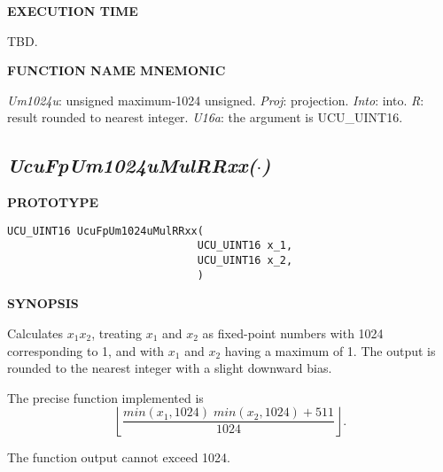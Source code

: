 \noindent\textbf{EXECUTION TIME}
\begin{list}{}{\setlength{\leftmargin}{0.25in}\setlength{\topsep}{0.0in}}
\item TBD.
\end{list}
\vspace{2.8ex}

\noindent\textbf{FUNCTION NAME MNEMONIC}
\begin{list}{}{\setlength{\leftmargin}{0.25in}\setlength{\topsep}{0.0in}}
\item \emph{Um1024u}: unsigned maximum-1024 unsigned.
      \emph{Proj}:    projection.
      \emph{Into}:    into.
      \emph{R}:       result rounded to nearest integer.
      \emph{U16a}:    the argument is UCU\_UINT16.
\end{list}


\subsection[\emph{UcuFpUm1024uMulRRxx(\protect\mbox{\protect$\cdot$})}]
           {\emph{UcuFpUm1024uMulRRxx(\protect\mbox{\protect\boldmath $\cdot$})}}
\label{cfpa0:subf0:sfaa1}

%

\noindent\textbf{PROTOTYPE}
\begin {list}{}{\setlength{\leftmargin}{0.25in}\setlength{\topsep}{0.0in}}
\item
\begin{verbatim}
UCU_UINT16 UcuFpUm1024uMulRRxx(
                              UCU_UINT16 x_1, 
                              UCU_UINT16 x_2, 
                              )
\end{verbatim}
\end{list}
\vspace{2.8ex}

\noindent\textbf{SYNOPSIS}
\begin{list}{}{\setlength{\leftmargin}{0.25in}\setlength{\topsep}{0.0in}}
\item Calculates $x_1 x_2$, treating $x_1$ and $x_2$ as fixed-point numbers with 1024 corresponding
      to 1, and with $x_1$ and $x_2$ having a maximum of 1. The output is rounded to the nearest
      integer with a slight downward bias.
\item The precise function implemented is
      \begin{equation}
      \left\lfloor \frac{min(x_1, 1024) \; min(x_2, 1024) + 511}{1024} \right\rfloor.
      \end{equation}
\item The function output cannot exceed 1024.
\end{list}
\vspace{2.8ex}

